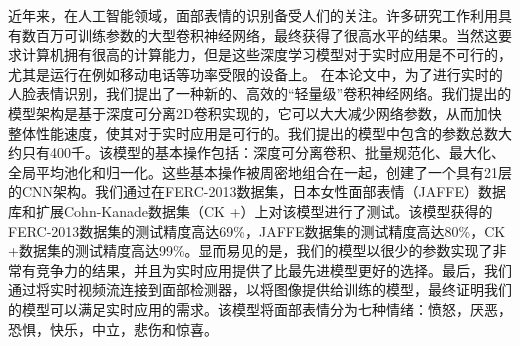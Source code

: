 \documentclass[master]{thesis-uestc}
\begin{document}

\begin{chineseabstract}
近年来，在人工智能领域，面部表情的识别备受人们的关注。许多研究工作利用具有数百万可训练参数的大型卷积神经网络，最终获得了很高水平的结果。当然这要求计算机拥有很高的计算能力，但是这些深度学习模型对于实时应用是不可行的，尤其是运行在例如移动电话等功率受限的设备上。
在本论文中，为了进行实时的人脸表情识别，我们提出了一种新的、高效的“轻量级”卷积神经网络。我们提出的模型架构是基于深度可分离2D卷积实现的，它可以大大减少网络参数，从而加快整体性能速度，使其对于实时应用是可行的。我们提出的模型中包含的参数总数大约只有400千。该模型的基本操作包括：深度可分离卷积、批量规范化、最大化、全局平均池化和归一化。这些基本操作被周密地组合在一起，创建了一个具有21层的CNN架构。我们通过在FERC-2013数据集，日本女性面部表情（JAFFE）数据库和扩展Cohn-Kanade数据集（CK +）上对该模型进行了测试。该模型获得的FERC-2013数据集的测试精度高达69\%，JAFFE数据集的测试精度高达80\%，CK +数据集的测试精度高达99\%。显而易见的是，我们的模型以很少的参数实现了非常有竞争力的结果，并且为实时应用提供了比最先进模型更好的选择。最后，我们通过将实时视频流连接到面部检测器，以将图像提供给训练的模型，最终证明我们的模型可以满足实时应用的需求。该模型将面部表情分为七种情绪：愤怒，厌恶，恐惧，快乐，中立，悲伤和惊喜。


\end{chineseabstract}
\end{document}
